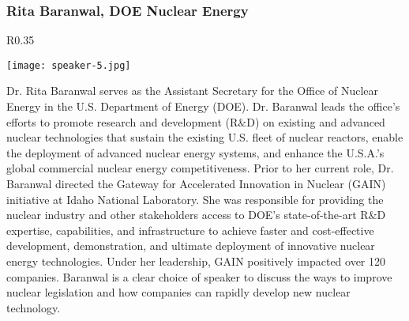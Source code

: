 \subsubsection{Rita Baranwal, DOE Nuclear Energy}
\setlength\intextsep{0pt}
\begin{wrapfigure}{R}{0.35\textwidth}
	\begin{center}
		\vspace{-\baselineskip}
		\texttt{[image: speaker-5.jpg]}
	\end{center}
\end{wrapfigure}
Dr. Rita Baranwal serves as the Assistant Secretary for the Office of Nuclear Energy in the U.S. Department of Energy (DOE).  Dr. Baranwal leads the office’s efforts to promote research and development (R$\&$D) on existing and advanced nuclear technologies that sustain the existing U.S. fleet of nuclear reactors, enable the deployment of advanced nuclear energy systems, and enhance the U.S.A.'s global commercial nuclear energy competitiveness. Prior to her current role, Dr. Baranwal directed the Gateway for Accelerated Innovation in Nuclear (GAIN) initiative at Idaho National Laboratory.  She was responsible for providing the nuclear industry and other stakeholders access to DOE's state-of-the-art R$\&$D expertise, capabilities, and infrastructure to achieve faster and cost-effective development, demonstration, and ultimate deployment of innovative nuclear energy technologies. Under her leadership, GAIN positively impacted over 120 companies. Baranwal is a clear choice of speaker to discuss the ways to improve nuclear legislation and how companies can rapidly develop new nuclear technology.\\


